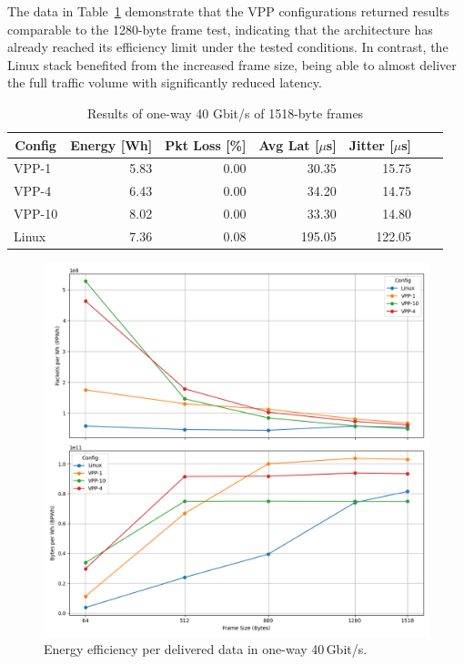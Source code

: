 The data in Table~\ref{tab:40udp:1518B} demonstrate that the VPP configurations returned results comparable to the 1280-byte frame test,
indicating that the architecture has already reached its efficiency limit under the tested conditions.
In contrast, the Linux stack benefited from the increased frame size, being able to almost deliver the full traffic volume with significantly reduced latency.

\begin{table}[h!]
\centering
\caption{Results of one-way 40 Gbit/s of 1518-byte frames}
\begin{tabular}{|l|r|r|r|r|r|r|}
\hline
\multicolumn{1}{|c|}{\textbf{Config}} &
\multicolumn{1}{c|}{\textbf{Energy [Wh] }} &
\multicolumn{1}{c|}{\textbf{Pkt Loss [\%]}} &
\multicolumn{1}{c|}{\textbf{Avg Lat [$\mu$s]}} &
\multicolumn{1}{c|}{\textbf{Jitter [$\mu$s]}} \\
\hline 
VPP-1 & 5.83 & 0.00 & 30.35 & 15.75 \\
VPP-4 & 6.43 & 0.00 & 34.20 & 14.75 \\
VPP-10 & 8.02 & 0.00 & 33.30 & 14.80 \\
Linux & 7.36 & 0.08 & 195.05 & 122.05 \\
\hline
\end{tabular}
\label{tab:40udp:1518B}
\end{table}

\begin{figure}[!htbp]
    \centering
    \includegraphics[width=\linewidth]{images/consumption-40g.png}
    \caption{Energy efficiency per delivered data in one-way 40\,Gbit/s.}
    \label{fig:40g}
\end{figure}




